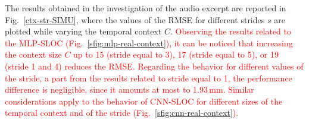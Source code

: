 \documentclass[review]{elsarticle}
\newcommand{\figref}[1]{Fig.~\ref{#1}}
\begin{document}
The  results obtained in the investigation of the audio excerpt are reported in \figref{ctx-str-SIMU}, where the values of the RMSE for different strides $s$ are plotted while varying the temporal context $C$. %
\textcolor{red}{Observing the results related to the MLP-SLOC (\figref{sfig:mlp-real-context}), it can be noticed that increasing the context size $C$ up to 15 (stride equal to 3), 17 (stride equal to 5), or 19 (stride 1 and 4) reduces the RMSE. Regarding the behavior for different values of the stride, a part from the results related to stride equal to 1, the performance difference is negligible, since it amounts at most to 1.93\,mm. Similar considerations apply to the behavior of CNN-SLOC for different sizes of the temporal context and of the stride (\figref{sfig:cnn-real-context}).}
\end{document}
